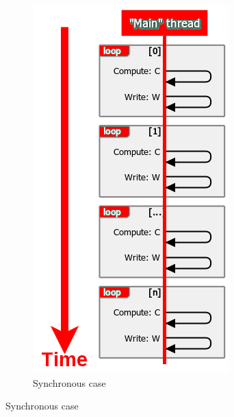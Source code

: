 		\begin{figure}[!h]
				\centering
				\begin{subfigure}[b]{0.33\textwidth}
					\centering
					\includegraphics[width=\textwidth]{charts/internshipJulich_model_0-IO-simple.png}
					\caption[Synchronous case]
					{{\small Synchronous case}}
				\end{subfigure}
				\hfill

\end{figure}
